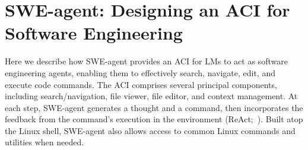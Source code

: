 \section{
SWE-agent: Designing an ACI for Software Engineering
}
\label{sec:sweagent}



Here we describe how SWE-agent provides an ACI for LMs to act as software engineering agents, enabling them to effectively search, navigate, edit, and execute code commands.
The ACI comprises several principal components, including search/navigation, file viewer, file editor, and context management.
At each step, SWE-agent generates a thought and a command, then incorporates the feedback from the command's execution in the environment (ReAct;~\citet{yao2023react}).
Built atop the Linux shell, SWE-agent also allows access to common Linux commands and utilities when needed.

